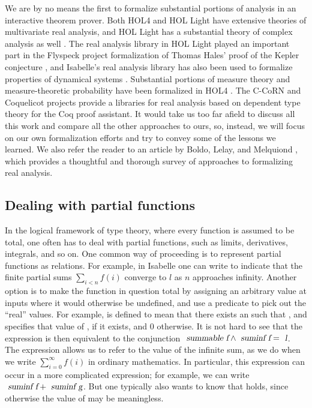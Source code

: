 \documentclass{svjour3}
\begin{document}
We are by no means the first to formalize substantial portions of analysis in an interactive theorem prover. Both HOL4 and HOL Light have extensive theories of multivariate real analysis, and HOL Light has a substantial theory of complex analysis as well \cite{harrison:07a}. The real analysis library in HOL Light played an important part in the Flyspeck project formalization of Thomas Hales' proof of the Kepler conjecture \cite{hales:et:al:15}, and Isabelle's real analysis library has also been used to formalize properties of dynamical systems \cite{immler:traut:16}. Substantial portions of measure theory and measure-theoretic probability have been formalized in HOL4 \cite{mhamdi:et:al:11,qasim:et:al:16}. The C-CoRN and Coquelicot projects \cite{krebbers:spitters:11,boldo:et:al:12} provide a libraries for real analysis based on dependent type theory for the Coq proof assistant. It would take us too far afield to discuss all this work and compare all the other approaches to ours, so, instead, we will focus on our own formalization efforts and try to convey some of the lessons we learned. We also refer the reader to an article by Boldo, Lelay, and Melquiond \cite{boldo:et:al:16}, which provides a thoughtful and thorough survey of approaches to formalizing real analysis.

\subsection{Dealing with partial functions}
\label{subsection:partial}

In the logical framework of type theory, where every function is assumed to be total, one often has to deal with partial functions, such as limits, derivatives, integrals, and so on. One common way of proceeding is to represent partial functions as relations. For example, in Isabelle one can write  to indicate that the finite partial sums $\sum_{i < n} f(i)$ converge to $l$ as $n$ approaches infinity. Another option is to make the function in question total by assigning an arbitrary value at inputs where it would otherwise be undefined, and use a predicate to pick out the ``real'' values. For example,  is defined to mean that there exists an  such that , and  specifies that value of , if it exists, and $0$ otherwise. It is not hard to see that the expression  is then equivalent to the conjunction $\isa{summable f} \wedge \isa{suminf f} = \isa{l}$. The expression  allows us to refer to the value of the infinite sum, as we do when we write $\sum_{i = 0}^\infty f(i)$ in ordinary mathematics. In particular, this expression can occur in a more complicated expression; for example, we can write $\isa{suminf f} + \isa{suminf g}$. But one typically also wants to know that  holds, since otherwise the value of  may be meaningless.
\end{document}
